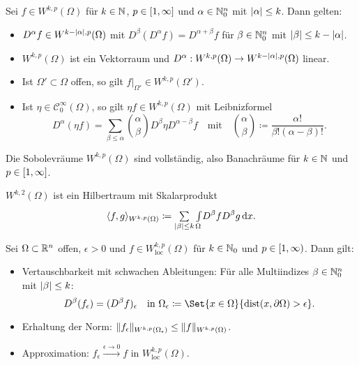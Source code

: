 \documentclass{cheat-sheet}
\newcommand{\dist}{\mathrm{dist}} %
\newcommand{\scp}[2]{\langle #1 , #2 \rangle} %
\begin{document}

\begin{satz}
  Sei $f \in W^{k,p}(\Omega)$ für $k \in \mathbb{N}$, $p \in \left[ 1, \infty \right]$ und $\alpha \in \mathbb{N}_0^n$ mit $\lvert\alpha\rvert \leq k$. Dann gelten:
  \begin{itemize}
    \item $D^\alpha f \in W^{k - \lvert\alpha\rvert,p}(\Omega)$ mit $D^\beta (D^\alpha f) = D^{\alpha + \beta} f$ für $\beta \in \mathbb{N}_0^n$ mit $\lvert\beta\rvert \leq k - \lvert\alpha\rvert$.
    \item $W^{k,p}(\Omega)$ ist ein Vektorraum und $D^\alpha : W^{k,p}(\Omega) \to W^{k - \lvert\alpha\rvert,p}(\Omega)$ linear.
    \item Ist $\Omega' \subset \Omega$ offen, so gilt $f|_{\Omega'} \in W^{k,p}(\Omega')$.
    \item Ist $\eta \in \mathcal{C}_0^\infty(\Omega)$, so gilt $\eta f \in W^{k,p}(\Omega)$ mit Leibnizformel
    \[
      D^\alpha(\eta f) = \sum_{\beta \leq \alpha} \binom{\alpha}{\beta} D^\beta \eta D^{\alpha - \beta} f
      \quad \text{mit} \quad
      \binom{\alpha}{\beta} \coloneqq \frac{\alpha!}{\beta! (\alpha - \beta)!}.
    \]
  \end{itemize}
\end{satz}

\begin{satz}
  Die Sobolevräume $W^{k,p}(\Omega)$ sind vollständig, also Banachräume für $k \in \mathbb{N}$ und $p \in \left[ 1, \infty \right]$.
\end{satz}

\begin{bem}
  $W^{k,2}(\Omega)$ ist ein Hilbertraum mit Skalarprodukt
  \[
    \scp{f}{g}_{W^{k,p}(\Omega)} \coloneqq \sum_{\abs{\beta} \leq k} \Int{\Omega}{}{D^\beta f D^\beta g}{x}.
  \]
\end{bem}

\begin{satz}
  Sei $\Omega \subset \mathbb{R}^n$ offen, $\epsilon > 0$ und $f \in W^{k,p}_{\text{loc}}(\Omega)$ für $k \in \mathbb{N}_0$ und $p \in \left[ 1, \infty \right)$. Dann gilt:
  \begin{itemize}
    \item Vertauschbarkeit mit schwachen Ableitungen: Für alle Multiindizes $\beta \in \mathbb{N}_0^n$ mit $\lvert\beta\rvert \leq k$:
    \[
      D^\beta (f_{\epsilon}) = (D^\beta f)_{\epsilon}
      \quad \text{in } \Omega_{\epsilon} \coloneqq \Set{x \in \Omega}{ \dist(x, \partial \Omega) > \epsilon }.
    \]
    \item Erhaltung der Norm: $\lVert f_\epsilon\rVert_{W^{k,p}(\Omega_\epsilon)} \leq \lVert f\rVert_{W^{k,p}(\Omega)}$.
    \item Approximation: $f_\epsilon \xrightarrow{\epsilon \to 0} f$ in $W^{k,p}_{\text{loc}}(\Omega)$.
  \end{itemize}
\end{satz}
\end{document}
